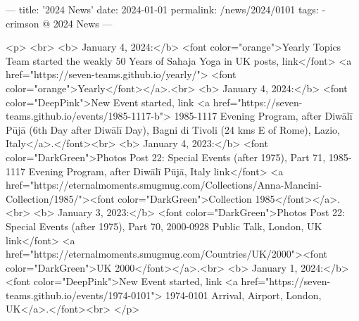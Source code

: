 ---
title: '2024 News'
date: 2024-01-01
permalink: /news/2024/0101
tags:
  - crimson @ 2024 News
---

<p>
<br>
<b> January 4, 2024:</b> <font color="orange">Yearly Topics Team started the weakly 50 Years of Sahaja Yoga in UK posts, link</font> <a href="https://seven-teams.github.io/yearly/"> <font color="orange">Yearly</font></a>.<br>
<b> January 4, 2024:</b> <font color="DeepPink">New Event started, link <a href="https://seven-teams.github.io/events/1985-1117-b"> 1985-1117 Evening Program, after Diwālī Pūjā (6th Day after Diwālī Day), Bagni di Tivoli (24 kms E of Rome), Lazio, Italy</a>.</font><br>
<b> January 4, 2023:</b> <font color="DarkGreen">Photos Post 22: Special Events (after 1975), Part 71, 1985-1117 Evening Program, after Diwālī Pūjā, Italy link</font> <a href="https://eternalmoments.smugmug.com/Collections/Anna-Mancini-Collection/1985/"><font color="DarkGreen">Collection 1985</font></a>.<br>
<b> January 3, 2023:</b> <font color="DarkGreen">Photos Post 22: Special Events (after 1975), Part 70, 2000-0928 Public Talk, London, UK link</font> <a href="https://eternalmoments.smugmug.com/Countries/UK/2000"><font color="DarkGreen">UK 2000</font></a>.<br>
<b> January 1, 2024:</b> <font color="DeepPink">New Event started, link <a href="https://seven-teams.github.io/events/1974-0101"> 1974-0101 Arrival, Airport, London, UK</a>.</font><br>
</p>